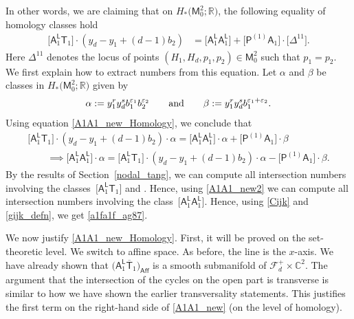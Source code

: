 \documentclass[pdftex]{sigma}
\numberwithin{equation}{section}
\begin{document}
In other words, we are claiming that on $H_*\bigl(\mathsf{M}^2_0; \mathbb{R}\bigr)$, the
following equality of homology classes hold
\begin{align}
\bigl[\mathsf{A}_1^{\mathsf{L}} \mathsf{T}_1\bigr] \cdot (y_d-y_1+ (d-1)b_2 ) & =
\bigl[\mathsf{A}_1^{\mathsf{L}} \mathsf{A}_1^{\mathsf{L}}\bigr] +
\bigl[\mathsf{P}^{(1)}\mathsf{A}_1\bigr]\cdot \bigl[\Delta^{11}\bigr]. \label{A1A1_new_Homology}
\end{align}
Here $\Delta^{11}$ denotes the locus of points $(H_1, H_d, p_1, p_2) \in \mathsf{M}^2_0$
such that $p_1 = p_2$. We first explain how to extract numbers from this equation.
Let $\alpha$ and $\beta$ be classes in $H_*\bigl(\mathsf{M}^2_0; \mathbb{R}\bigr)$
given by
\[\alpha := y_1^r y_d^s b_1^{\varepsilon_1} b_2^{\varepsilon_2} \qquad \textnormal{and} \qquad
\beta := y_1^r y_d^s b_1^{\varepsilon_1+ \varepsilon_2}.\]
Using equation \eqref{A1A1_new_Homology}, we conclude that
\begin{gather}
\bigl[\mathsf{A}_1^{\mathsf{L}} \mathsf{T}_1\bigr] \cdot (y_d-y_1+ (d-1)b_2 ) \cdot \alpha  =
\bigl[\mathsf{A}_1^{\mathsf{L}} \mathsf{A}_1^{\mathsf{L}}\bigr] \cdot \alpha + \bigl[\mathsf{P}^{(1)}\mathsf{A}_1\bigr]\cdot \beta \label{A1A1_new} \\
\qquad\implies \bigl[\mathsf{A}_1^{\mathsf{L}} \mathsf{A}_1^{\mathsf{L}}\bigr] \cdot \alpha  =
\bigl[\mathsf{A}_1^{\mathsf{L}} \mathsf{T}_1\bigr] \cdot (y_d-y_1+ (d-1)b_2 ) \cdot \alpha
-\bigl[\mathsf{P}^{(1)}\mathsf{A}_1\bigr]\cdot \beta. \label{A1A1_new2}
\end{gather}
By the results of Section~\ref{nodal_tang}, we can compute all intersection
numbers involving the classes~${\bigl[\mathsf{A}_1^{\mathsf{L}} \mathsf{T}_1\bigr]}$ and
. Hence, using \eqref{A1A1_new2} we can compute all intersection numbers
involving the class~${\bigl[\mathsf{A}_1^{\mathsf{L}} \mathsf{A}_1^{\mathsf{L}}\bigr]}$.
Hence, using \eqref{Cijk} and \eqref{gijk_defn}, we get \eqref{a1fa1f_ag87}.

We now justify \eqref{A1A1_new_Homology}.
First, it will be proved on the set-theoretic level.
We switch to affine space. As before, the line is the $x$-axis.
We have already shown that $\bigl(\mathsf{A}_1^{\mathsf{L}} \overline{\mathsf{T}}_1\bigr)_{\mathsf{Aff}}$ is a smooth
submanifold of $\mathcal{F}_d^{+} \times \mathbb{C}^2$. The argument that the intersection of the cycles on the
open part is transverse is similar to how we have shown the earlier transversality statements. This justifies the
first term on the right-hand side of \eqref{A1A1_new} (on the level of homology).
\end{document}
